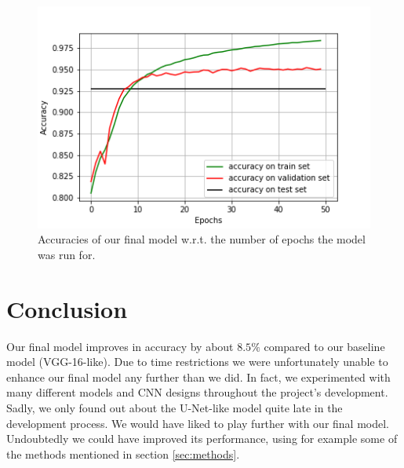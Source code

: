 \documentclass[10pt,conference,compsocconf]{IEEEtran}
\begin{document}
\begin{figure}[h]
	\centering
	\includegraphics[width=\columnwidth]{U_Net_patches_256.png}
	\captionsetup{justification=centering, margin=0.2cm}
	\caption{Accuracies of our final model w.r.t. the number of epochs the model was run for.}
	\vspace{-6mm}
	\label{fig:final}
\end{figure}

\section{Conclusion}
\label{sec:conclusion}

Our final model improves in accuracy by about $8.5\%$ compared to our baseline model (VGG-16-like). Due to time restrictions we were unfortunately unable to enhance our final model any further than we did. In fact, we experimented with many different models and CNN designs throughout the project's development. Sadly, we only found out about the U-Net-like model quite late in the development process. We would have liked to play further with our final model. Undoubtedly we could have improved its performance, using for example some of the methods mentioned in section \ref{sec:methods}. 
\end{document}
